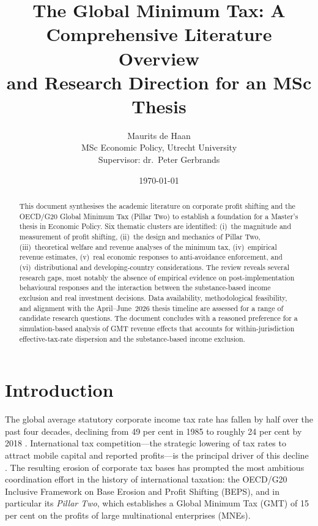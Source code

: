\documentclass[12pt,a4paper]{article}
\title{%
  \textbf{The Global Minimum Tax: A Comprehensive Literature Overview\\
  and Research Direction for an MSc Thesis}%
}
\author{%
  Maurits de Haan\\
  \small MSc Economic Policy, Utrecht University\\
  \small Supervisor: dr.\ Peter Gerbrands%
}
\date{\today}
\begin{document}
\maketitle

\begin{abstract}
This document synthesises the academic literature on corporate profit shifting and the OECD/G20 Global Minimum Tax (Pillar Two) to establish a foundation for a Master's thesis in Economic Policy.
Six thematic clusters are identified: (i)~the magnitude and measurement of profit shifting, (ii)~the design and mechanics of Pillar Two, (iii)~theoretical welfare and revenue analyses of the minimum tax, (iv)~empirical revenue estimates, (v)~real economic responses to anti-avoidance enforcement, and (vi)~distributional and developing-country considerations.
The review reveals several research gaps, most notably the absence of empirical evidence on post-implementation behavioural responses and the interaction between the substance-based income exclusion and real investment decisions.
Data availability, methodological feasibility, and alignment with the April--June~2026 thesis timeline are assessed for a range of candidate research questions.
The document concludes with a reasoned preference for a simulation-based analysis of GMT revenue effects that accounts for within-jurisdiction effective-tax-rate dispersion and the substance-based income exclusion.
\end{abstract}

\newpage
\tableofcontents
\newpage

\section{Introduction}\label{sec:introduction}

The global average statutory corporate income tax rate has fallen by half over the past four decades, declining from 49 per cent in 1985 to roughly 24 per cent by 2018 \parencite{torslov2022}.
International tax competition---the strategic lowering of tax rates to attract mobile capital and reported profits---is the principal driver of this decline \parencite{cassee2019}.
The resulting erosion of corporate tax bases has prompted the most ambitious coordination effort in the history of international taxation: the OECD/G20 Inclusive Framework on Base Erosion and Profit Shifting (BEPS), and in particular its \emph{Pillar Two}, which establishes a Global Minimum Tax (GMT) of 15 per cent on the profits of large multinational enterprises (MNEs).
\end{document}
